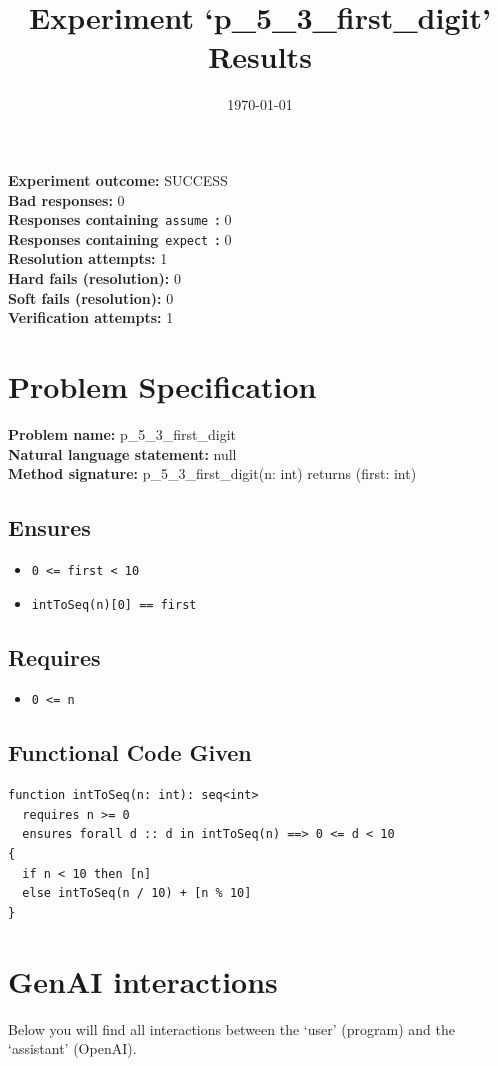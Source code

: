 \documentclass{article}
\begin{document}
\title{Experiment `p\_5\_3\_first\_digit' Results}
\author{\today}
\date{}
\maketitle
\textbf{Experiment outcome: }SUCCESS
\\\textbf{Bad responses: }0
\\\textbf{Responses containing}~\texttt{assume}~\textbf{: }0
\\\textbf{Responses containing}~\texttt{expect}~\textbf{: }0
\\\textbf{Resolution attempts: }1
\\\textbf{Hard fails (resolution): }0
\\\textbf{Soft fails (resolution): }0
\\\textbf{Verification attempts: }1
\section*{Problem Specification}
\textbf{Problem name: }p\_5\_3\_first\_digit
\\\textbf{Natural language statement: }null
\\\textbf{Method signature: }p\_5\_3\_first\_digit(n: int) returns (first: int)
\subsection*{Ensures}
\begin{itemize}
\item \texttt{0 <= first < 10}
\item \texttt{intToSeq(n)[0] == first}
\end{itemize}
\subsection*{Requires}
\begin{itemize}
\item \texttt{0 <= n}
\end{itemize}
\subsection*{Functional Code Given}
\begin{lstlisting}
function intToSeq(n: int): seq<int>
  requires n >= 0
  ensures forall d :: d in intToSeq(n) ==> 0 <= d < 10
{
  if n < 10 then [n]
  else intToSeq(n / 10) + [n % 10]
}
\end{lstlisting}
\clearpage
\section*{GenAI interactions}
Below you will find all interactions between the `user' (program) and the `assistant' (OpenAI).
\end{document}
